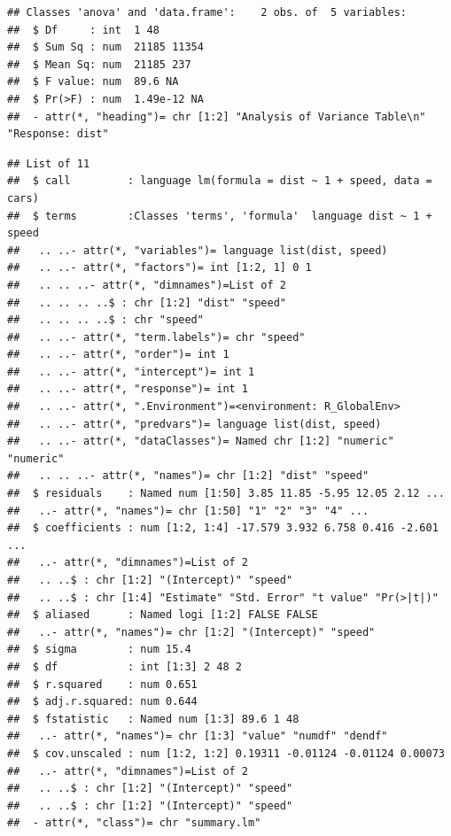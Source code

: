 \documentclass[krantz2]{krantz}\usepackage{knitr}
\begin{document}
\begin{explainbox}
\begin{knitrout}\footnotesize
{}\color{fgcolor}\begin{kframe}
\begin{alltt}
\hlstd{(}
\end{alltt}
\begin{verbatim}
## Classes 'anova' and 'data.frame':	2 obs. of  5 variables:
##  $ Df     : int  1 48
##  $ Sum Sq : num  21185 11354
##  $ Mean Sq: num  21185 237
##  $ F value: num  89.6 NA
##  $ Pr(>F) : num  1.49e-12 NA
##  - attr(*, "heading")= chr [1:2] "Analysis of Variance Table\n" "Response: dist"
\end{verbatim}
\end{kframe}
\end{knitrout}

\begin{knitrout}\footnotesize
{}\color{fgcolor}\begin{kframe}
\begin{alltt}
\hlstd{(}
\end{alltt}
\begin{verbatim}
## List of 11
##  $ call         : language lm(formula = dist ~ 1 + speed, data = cars)
##  $ terms        :Classes 'terms', 'formula'  language dist ~ 1 + speed
##   .. ..- attr(*, "variables")= language list(dist, speed)
##   .. ..- attr(*, "factors")= int [1:2, 1] 0 1
##   .. .. ..- attr(*, "dimnames")=List of 2
##   .. .. .. ..$ : chr [1:2] "dist" "speed"
##   .. .. .. ..$ : chr "speed"
##   .. ..- attr(*, "term.labels")= chr "speed"
##   .. ..- attr(*, "order")= int 1
##   .. ..- attr(*, "intercept")= int 1
##   .. ..- attr(*, "response")= int 1
##   .. ..- attr(*, ".Environment")=<environment: R_GlobalEnv>
##   .. ..- attr(*, "predvars")= language list(dist, speed)
##   .. ..- attr(*, "dataClasses")= Named chr [1:2] "numeric" "numeric"
##   .. .. ..- attr(*, "names")= chr [1:2] "dist" "speed"
##  $ residuals    : Named num [1:50] 3.85 11.85 -5.95 12.05 2.12 ...
##   ..- attr(*, "names")= chr [1:50] "1" "2" "3" "4" ...
##  $ coefficients : num [1:2, 1:4] -17.579 3.932 6.758 0.416 -2.601 ...
##   ..- attr(*, "dimnames")=List of 2
##   .. ..$ : chr [1:2] "(Intercept)" "speed"
##   .. ..$ : chr [1:4] "Estimate" "Std. Error" "t value" "Pr(>|t|)"
##  $ aliased      : Named logi [1:2] FALSE FALSE
##   ..- attr(*, "names")= chr [1:2] "(Intercept)" "speed"
##  $ sigma        : num 15.4
##  $ df           : int [1:3] 2 48 2
##  $ r.squared    : num 0.651
##  $ adj.r.squared: num 0.644
##  $ fstatistic   : Named num [1:3] 89.6 1 48
##   ..- attr(*, "names")= chr [1:3] "value" "numdf" "dendf"
##  $ cov.unscaled : num [1:2, 1:2] 0.19311 -0.01124 -0.01124 0.00073
##   ..- attr(*, "dimnames")=List of 2
##   .. ..$ : chr [1:2] "(Intercept)" "speed"
##   .. ..$ : chr [1:2] "(Intercept)" "speed"
##  - attr(*, "class")= chr "summary.lm"
\end{verbatim}
\end{kframe}
\end{knitrout}


\end{explainbox}
\end{document}
